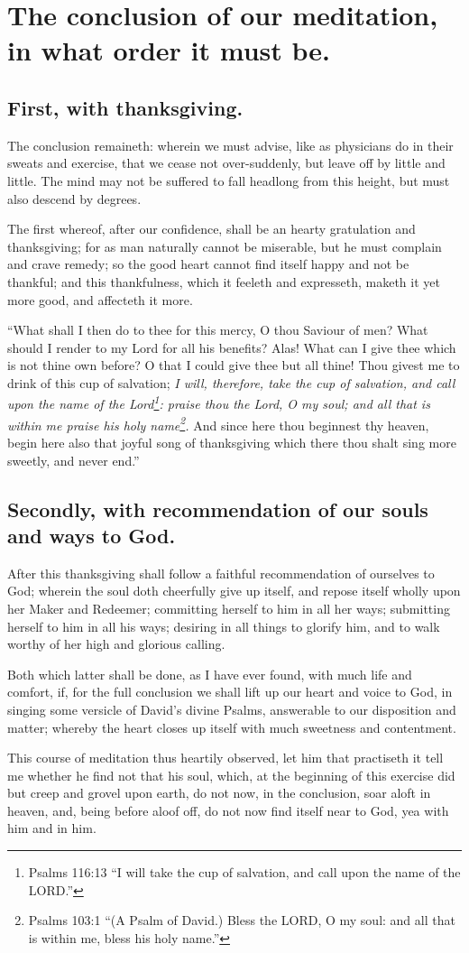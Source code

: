\chapter{The conclusion of our meditation, in what order it must be.}
\section{First, with thanksgiving.}

The conclusion remaineth: wherein we must advise, like as physicians do in their sweats and exercise, that we cease not over-suddenly, but leave off by little and little. The mind may not be suffered to fall headlong from this height, but must also descend by degrees. 

The first whereof, after our confidence, shall be an hearty gratulation and thanksgiving; for as man naturally cannot be miserable, but he must complain and crave remedy; so the good heart cannot find itself happy and not be thankful; and this thankfulness, which it feeleth and expresseth, maketh it yet more good, and affecteth it more. 

``What shall I then do to thee for this mercy, O thou Saviour of men? What should I render to my Lord for all his benefits? Alas! What can I give thee which is not thine own before? O that I could give thee but all thine! Thou givest me to drink of this cup of salvation; \emph{I will, therefore, take the cup of salvation, and call upon the name of the Lord\footnote{Psalms 116:13 ``I will take the cup of salvation, and call upon the name of the LORD.''}: praise thou the Lord, O my soul; and all that is within me praise his holy name\footnote{Psalms 103:1 ``(A Psalm of David.) Bless the LORD, O my soul: and all that is within me, bless his holy name.'' }.} And since here thou beginnest thy heaven, begin here also that joyful song of thanksgiving which there thou shalt sing more sweetly, and never end.''

\section{Secondly, with recommendation of our souls and ways to God.}

After this thanksgiving shall follow a faithful recommendation of ourselves to God; wherein the soul doth cheerfully give up itself, and repose itself wholly upon her Maker and Redeemer; committing herself to him in all her ways; submitting herself to him in all his ways; desiring in all things to glorify him, and to walk worthy of her high and glorious calling. 

Both which latter shall be done, as I have ever found, with much life and comfort, if, for the full conclusion we shall lift up our heart and voice to God, in singing some versicle of David's divine Psalms, answerable to our disposition and matter; whereby the heart closes up itself with much sweetness and contentment. 

This course of meditation thus heartily observed, let him that practiseth it tell me whether he find not that his soul, which, at the beginning of this exercise did but creep and grovel upon earth, do not now, in the conclusion, soar aloft in heaven, and, being before aloof off, do not now find itself near to God, yea with him and in him. 